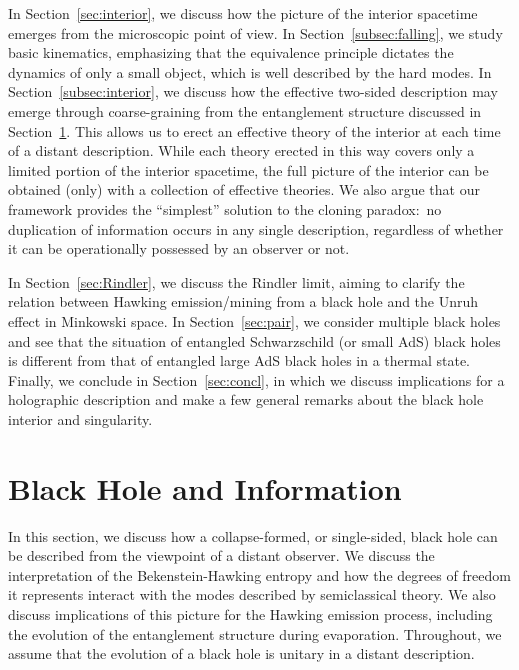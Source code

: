 \documentclass[12pt]{article}
\begin{document}
In Section~\ref{sec:interior}, we discuss how the picture of 
the interior spacetime emerges from the microscopic point of 
view.  In Section~\ref{subsec:falling}, we study basic kinematics, 
emphasizing that the equivalence principle dictates the dynamics 
of only a small object, which is well described by the hard modes. 
In Section~\ref{subsec:interior}, we discuss how the effective 
two-sided description may emerge through coarse-graining from 
the entanglement structure discussed in Section~\ref{sec:distant}. 
This allows us to erect an effective theory of the interior at 
each time of a distant description.  While each theory erected 
in this way covers only a limited portion of the interior spacetime, 
the full picture of the interior can be obtained (only) with a 
collection of effective theories.  We also argue that our framework 
provides the ``simplest'' solution to the cloning paradox:\ 
no duplication of information occurs in any single description, 
regardless of whether it can be operationally possessed by an 
observer or not.

In Section~\ref{sec:Rindler}, we discuss the Rindler limit, aiming 
to clarify the relation between Hawking emission/mining from 
a black hole and the Unruh effect in Minkowski space.  In 
Section~\ref{sec:pair}, we consider multiple black holes and 
see that the situation of entangled Schwarzschild (or small 
AdS) black holes is different from that of entangled large 
AdS black holes in a thermal state.  Finally, we conclude in 
Section~\ref{sec:concl}, in which we discuss implications for 
a holographic description and make a few general remarks about 
the black hole interior and singularity.


\section{Black Hole and Information}
\label{sec:distant}

In this section, we discuss how a collapse-formed, or single-sided, 
black hole can be described from the viewpoint of a distant 
observer.  We discuss the interpretation of the Bekenstein-Hawking 
entropy and how the degrees of freedom it represents interact 
with the modes described by semiclassical theory.  We also discuss 
implications of this picture for the Hawking emission process, 
including the evolution of the entanglement structure during 
evaporation.  Throughout, we assume that the evolution of a black 
hole is unitary in a distant description.
\end{document}
